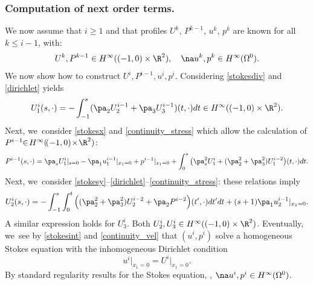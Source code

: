 \subsubsection*{Computation of next order terms.} We now assume that $i \ge 1$ and that profiles $U^k$, $P^{k-1}$, $u^k$, $p^k$ are known for all $k \le i-1$, with:
\[
U^k, P^{k-1} \in H^\infty((-1,0) \times \R^2), \quad \na u^k, p^k \in H^\infty(\Omega^0).
\]
We now show how to construct $U^i,P^{i-1}, u^i, p^i$. Considering \eqref{stokesdiv} and \eqref{dirichlet} yields
\[
U^i_1(s,\cdot) = - \int_{-1}^s (\pa_2 U^{i-1}_2 + \pa_3 U^{i-1}_3)(t,\cdot) dt \in H^\infty((-1,0) \times \R^2).
\]
Next, we~consider \eqref{stokesx} and \eqref{continuity_stress} which allow the calculation of \hbox{$P^{i-1} \!\!\in\! H^\infty(\!({-}1,0)\!\times\! \R^2)$}:
\[
P^{i-1}(s,\cdot) = \pa_s U^i_1\vert_{s=0} - \pa_1 u^{i-1}_1\vert_{x_1=0} + p^{i-1}\vert_{x_1=0}
+ \int_0^s \big(\pa^2_s U^i_1 + (\pa^2_2 + \pa^2_3) U^{i-2}_1 \big)(t,\cdot) dt.
\]
Next, we~consider \eqref{stokesy}--\eqref{dirichlet}--\eqref{continuity_stress}: these relations imply
\[
U^i_2(s,\cdot) = - \int_{-1}^s \int_{0}^t \Big((\pa^2_2 + \pa^2_3) U^{i-2}_2 + \pa_2 P^{i-2} \Big)(t',\cdot) dt' dt + (s+1) \pa_1 u^{i-1}_2\vert_{x_1=0}.
\]
A similar expression holds for $U^i_3$. Both $U^i_2, U^i_3 \in H^\infty((-1,0) \times \R^2)$. Eventually, we~see by \eqref{stokesint} and \eqref{continuity_vel} that $(u^i,p^i)$ solve a homogeneous Stokes equation with the inhomogeneous Dirichlet condition
\[
u^i\vert_{x_1=0} = U^i\vert_{x_1=0}.
\]
By standard regularity results for the Stokes equation, \cf
\cite[Th.\,IV.3.2 \& IV.3.3]{Galdi}, $\na u^i, p^i \in H^\infty(\Omega^0)$.

